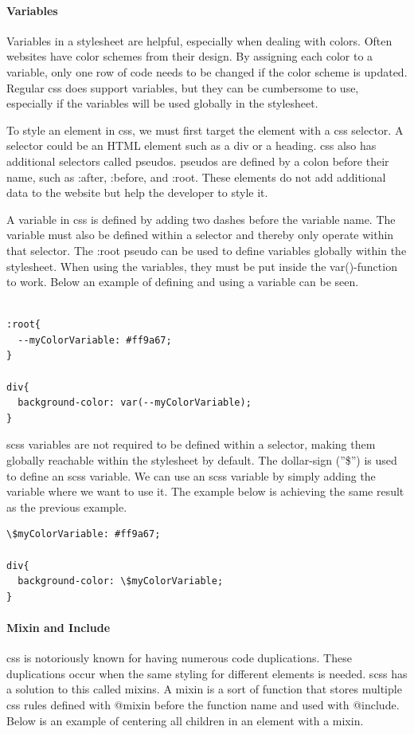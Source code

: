\paragraph{Variables}
Variables in a stylesheet are helpful, especially when dealing with colors. Often websites have color schemes from their design. By assigning each color to a variable, only one row of code needs to be changed if the color scheme is updated. Regular \acrshort{css} does support variables, but they can be cumbersome to use, especially if the variables will be used globally in the stylesheet.

To style an element in \acrshort{css}, we must first target the element with a \acrshort{css} selector. A selector could be an HTML element such as a div or a heading. \acrshort{css} also has additional selectors called \glspl{pseudo}. \Glspl{pseudo} are defined by a colon before their name, such as :after, :before, and :root. These elements do not add additional data to the website but help the developer to style it. 

A variable in \acrshort{css} is defined by adding two dashes before the variable name.  The variable must also be defined within a selector and thereby only operate within that selector. The :root \gls{pseudo} can be used to define variables globally within the stylesheet. When using the variables, they must be put inside the var()-function to work.
Below an example of defining and using a variable can be seen. 

\begin{lstlisting}[style=htmlcssjs]

:root{
  --myColorVariable: #ff9a67; 
}

div{
  background-color: var(--myColorVariable);
}
\end{lstlisting}


\acrshort{scss} variables are not required to be defined within a selector, making them globally reachable within the stylesheet by default. The dollar-sign (''\$'') is used to define an \acrshort{scss} variable. We can use an \acrshort{scss} variable by simply adding the variable where we want to use it. The example below is achieving the same result as the previous example.


\begin{lstlisting}[style=htmlcssjs]
\$myColorVariable: #ff9a67; 

div{
  background-color: \$myColorVariable;
}
\end{lstlisting}


\paragraph{Mixin and Include}
\acrshort{css} is notoriously known for having numerous code duplications. These duplications occur when the same styling for different elements is needed. \acrshort{scss} has a solution to this called \glspl{mixin}. A \gls{mixin} is a sort of function that stores multiple \acrshort{css} rules defined with @mixin before the function name and used with @include. Below is an example of centering all children in an element with a \gls{mixin}. 

